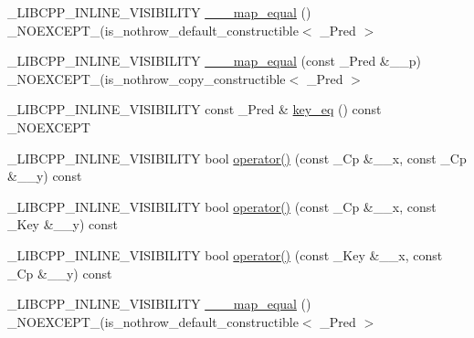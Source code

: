 \begin{DoxyCompactItemize}
\item 
\+\_\+\+L\+I\+B\+C\+P\+P\+\_\+\+I\+N\+L\+I\+N\+E\+\_\+\+V\+I\+S\+I\+B\+I\+L\+I\+T\+Y \hyperlink{class______map__equal_3_01___key_00_01___cp_00_01___pred_00_01false_01_4_a58d140185db242b2e905f1e094957896}{\+\_\+\+\_\+\+\_\+map\+\_\+equal} () \+\_\+\+N\+O\+E\+X\+C\+E\+P\+T\+\_\+(is\+\_\+nothrow\+\_\+default\+\_\+constructible$<$ \+\_\+\+Pred $>$
\item 
\+\_\+\+L\+I\+B\+C\+P\+P\+\_\+\+I\+N\+L\+I\+N\+E\+\_\+\+V\+I\+S\+I\+B\+I\+L\+I\+T\+Y \hyperlink{class______map__equal_3_01___key_00_01___cp_00_01___pred_00_01false_01_4_a20796310662e2eb592cacef4385b3223}{\+\_\+\+\_\+\+\_\+map\+\_\+equal} (const \+\_\+\+Pred \&\+\_\+\+\_\+p) \+\_\+\+N\+O\+E\+X\+C\+E\+P\+T\+\_\+(is\+\_\+nothrow\+\_\+copy\+\_\+constructible$<$ \+\_\+\+Pred $>$
\item 
\+\_\+\+L\+I\+B\+C\+P\+P\+\_\+\+I\+N\+L\+I\+N\+E\+\_\+\+V\+I\+S\+I\+B\+I\+L\+I\+T\+Y const \+\_\+\+Pred \& \hyperlink{class______map__equal_3_01___key_00_01___cp_00_01___pred_00_01false_01_4_a3bf1ce76006942fec62d148d68ac498b}{key\+\_\+eq} () const \+\_\+\+N\+O\+E\+X\+C\+E\+P\+T
\item 
\+\_\+\+L\+I\+B\+C\+P\+P\+\_\+\+I\+N\+L\+I\+N\+E\+\_\+\+V\+I\+S\+I\+B\+I\+L\+I\+T\+Y bool \hyperlink{class______map__equal_3_01___key_00_01___cp_00_01___pred_00_01false_01_4_a610f1a9c10d40791c098fe1af3beaf57}{operator()} (const \+\_\+\+Cp \&\+\_\+\+\_\+x, const \+\_\+\+Cp \&\+\_\+\+\_\+y) const 
\item 
\+\_\+\+L\+I\+B\+C\+P\+P\+\_\+\+I\+N\+L\+I\+N\+E\+\_\+\+V\+I\+S\+I\+B\+I\+L\+I\+T\+Y bool \hyperlink{class______map__equal_3_01___key_00_01___cp_00_01___pred_00_01false_01_4_af3ff9fb13ef0c4d455bdd274adf3b579}{operator()} (const \+\_\+\+Cp \&\+\_\+\+\_\+x, const \+\_\+\+Key \&\+\_\+\+\_\+y) const 
\item 
\+\_\+\+L\+I\+B\+C\+P\+P\+\_\+\+I\+N\+L\+I\+N\+E\+\_\+\+V\+I\+S\+I\+B\+I\+L\+I\+T\+Y bool \hyperlink{class______map__equal_3_01___key_00_01___cp_00_01___pred_00_01false_01_4_a2ae80d5d4f0899ce42eac8bba386eb9c}{operator()} (const \+\_\+\+Key \&\+\_\+\+\_\+x, const \+\_\+\+Cp \&\+\_\+\+\_\+y) const 
\item 
\+\_\+\+L\+I\+B\+C\+P\+P\+\_\+\+I\+N\+L\+I\+N\+E\+\_\+\+V\+I\+S\+I\+B\+I\+L\+I\+T\+Y \hyperlink{class______map__equal_3_01___key_00_01___cp_00_01___pred_00_01false_01_4_a58d140185db242b2e905f1e094957896}{\+\_\+\+\_\+\+\_\+map\+\_\+equal} () \+\_\+\+N\+O\+E\+X\+C\+E\+P\+T\+\_\+(is\+\_\+nothrow\+\_\+default\+\_\+constructible$<$ \+\_\+\+Pred $>$

\end{DoxyCompactItemize}
